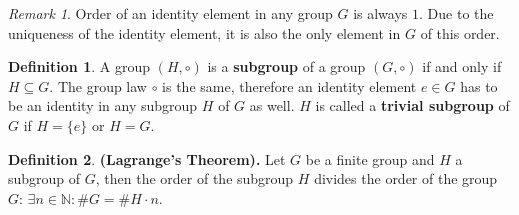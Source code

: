 \documentclass[thesis=M,english]{FITthesis}[2012/10/20]
\theoremstyle{remark}
\newtheorem*{RM}{Remark}
\newtheorem*{NRM}{Notational Remark}
\theoremstyle{definition}
\newtheorem{DF}{Definition}[section]
\begin{document}
\begin{RM}
Order of an identity element in any group $G$ is always $1$. Due to the uniqueness of the identity element, it is also the only element in $G$ of this order.
\end{RM}
\begin{DF}
A group $(H, \circ)$ is a \textbf{subgroup} of a group $(G, \circ)$ if and only if $H \subseteq G.$ The group law $\circ$ is the same, therefore an identity element $e \in G$ has to be an identity in any subgroup $H$ of $G$ as well. $H$ is called a \textbf{trivial subgroup} of $G$ if $H = \{e\}$ or $H = G$.
\end{DF}
\begin{DF}
\textbf{(Lagrange's Theorem).} Let $G$ be a finite group and $H$ a subgroup of $G$, then the order of the subgroup $H$ divides the order of the group $G$: $\exists n \in \mathbb{N}: \#G = \#H \cdot n.$
\label{lagrange}
\end{DF}
\end{document}
